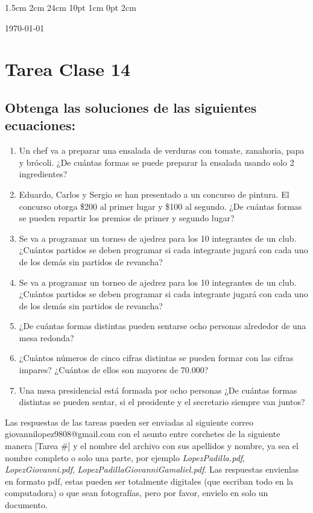 \documentclass[12pt,letterpaper]{report}
\begin{document}
\setmargins{2.5cm}      
{1.5cm}                     
{2cm}  
{24cm}                    
{10pt}                          
{1cm}                          
{0pt}                             
{2cm}
\begin{flushright}
\today
\end{flushright}
\vspace{-1.75cm}
\section*{Tarea Clase 14}
\subsection*{Obtenga las soluciones de las siguientes ecuaciones:}
\begin{enumerate}
\item Un chef va a preparar una ensalada de verduras con tomate, zanahoria, papa y brócoli. ¿De cuántas formas se puede preparar la ensalada usando solo 2 ingredientes?
\item Eduardo, Carlos y Sergio se han presentado a un concurso de pintura. El concurso otorga \$200 al primer lugar y  \$100 al segundo. ¿De cuántas formas se pueden repartir los premios de primer y segundo lugar?
\item Se va a programar un torneo de ajedrez para los 10 integrantes de un club. ¿Cuántos partidos se deben programar si cada integrante jugará con cada uno de los demás sin partidos de revancha?
\item Se va a programar un torneo de ajedrez para los 10 integrantes de un club. ¿Cuántos partidos se deben programar si cada integrante jugará con cada uno de los demás sin partidos de revancha?
\item ¿De cuántas formas distintas pueden sentarse ocho personas alrededor de una mesa redonda?
\item ¿Cuántos números de cinco cifras distintas se pueden formar con las cifras impares? ¿Cuántos de ellos son mayores de 70.000?
\item Una mesa presidencial está formada por ocho personas ¿De cuántas formas distintas se pueden sentar, si el presidente y el secretario siempre van juntos?
\end{enumerate}
Las respuestas de las tareas pueden ser enviadas al siguiente correo giovannilopez9808@gmail.com con el asunto entre corchetes de la siguiente manera [Tarea \#] y el nombre del archivo con sus apellidos y nombre, ya sea el nombre completo o solo una parte, por ejemplo \textit{LopezPadilla.pdf}, \textit{LopezGiovanni.pdf}, \textit{LopezPadillaGiovanniGamaliel.pdf}. Las respuestas envienlas en formato pdf, estas pueden ser totalmente digitales (que escriban todo en la computadora) o que sean fotografías, pero por favor, envielo en solo un documento.
\end{document}
